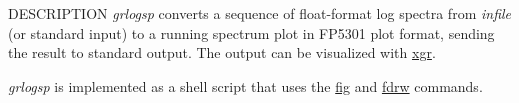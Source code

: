 \begin{synopsis}
\item[grlogsp] [ --t ] [ --F $F$] [ --O $O$ ] [ --x $X$ ] [ --y $ymin$ ] [ --yy $YY$ ]
	       [ --yo $YO$ ] [ --p $P$ ] 
\item[\ ~~~~~~~~] [ --ln $LN$ ] [ --s $S$ ] [ --e $E$ ] [ --n $N$ ] [ --l $L$ ] 
\item[\ ~~~~~~~~] [ --c $comment1$ ] [ --c2 $comment2$ ] [ --c3 $comment3$ ]
		  [ {\em infile} ]
\end{synopsis}

\begin{qsection}{DESCRIPTION}
{\em grlogsp} converts a sequence of float-format log spectra 
from {\em infile} (or standard input) 
to a running spectrum plot in FP5301 plot format,
sending the result to standard output. 
The output can be visualized with \hyperlink{xgr}{xgr}.

{\em grlogsp} is implemented as a shell script 
that uses the \hyperlink{fig}{fig} and \hyperlink{fdrw}{fdrw} commands.
\end{qsection}

